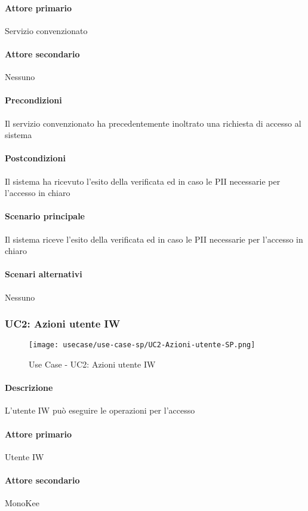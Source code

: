 \paragraph{Attore primario}  Servizio convenzionato
\paragraph{Attore secondario}  Nessuno
\paragraph{Precondizioni}  Il servizio convenzionato ha precedentemente inoltrato una richiesta di accesso al sistema
\paragraph{Postcondizioni} Il sistema ha ricevuto l’esito della verificata ed in caso le PII necessarie per l’accesso in chiaro
\paragraph{Scenario principale}  
Il sistema riceve l’esito della verificata ed in caso le PII necessarie per l’accesso in chiaro
\paragraph{Scenari alternativi}  Nessuno



\subsubsection{UC2: Azioni utente IW}
\begin{figure}[!htbp] 
    \centering 
    \texttt{[image: usecase/use-case-sp/UC2-Azioni-utente-SP.png]} 
    \caption{Use Case - UC2: Azioni utente IW}
\end{figure}

\paragraph{Descrizione} L’utente IW può eseguire le operazioni per l’accesso
\paragraph{Attore primario}  Utente IW
\paragraph{Attore secondario}  MonoKee
